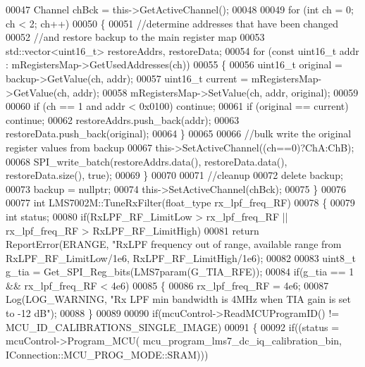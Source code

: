 \begin{DoxyCode}
00047     Channel chBck = this->GetActiveChannel();
00048 
00049     \textcolor{keywordflow}{for} (\textcolor{keywordtype}{int} ch = 0; ch < 2; ch++)
00050     \{
00051         \textcolor{comment}{//determine addresses that have been changed}
00052         \textcolor{comment}{//and restore backup to the main register map}
00053         std::vector<uint16\_t> restoreAddrs, restoreData;
00054         \textcolor{keywordflow}{for} (\textcolor{keyword}{const} uint16\_t addr : mRegistersMap->GetUsedAddresses(ch))
00055         \{
00056             uint16\_t original = backup->GetValue(ch, addr);
00057             uint16\_t current = mRegistersMap->GetValue(ch, addr);
00058             mRegistersMap->SetValue(ch, addr, original);
00059 
00060             \textcolor{keywordflow}{if} (ch == 1 and addr < 0x0100) \textcolor{keywordflow}{continue};
00061             \textcolor{keywordflow}{if} (original == current) \textcolor{keywordflow}{continue};
00062             restoreAddrs.push\_back(addr);
00063             restoreData.push\_back(original);
00064         \}
00065 
00066         \textcolor{comment}{//bulk write the original register values from backup}
00067         this->SetActiveChannel((ch==0)?ChA:ChB);
00068         SPI_write_batch(restoreAddrs.data(), restoreData.data(), restoreData.size(), \textcolor{keyword}{true});
00069     \}
00070 
00071     \textcolor{comment}{//cleanup}
00072     \textcolor{keyword}{delete} backup;
00073     backup = \textcolor{keyword}{nullptr};
00074     this->SetActiveChannel(chBck);
00075 \}
00076 
00077 \textcolor{keywordtype}{int} LMS7002M::TuneRxFilter(float_type rx\_lpf\_freq\_RF)
00078 \{
00079     \textcolor{keywordtype}{int} status;
00080     \textcolor{keywordflow}{if}(RxLPF_RF_LimitLow > rx\_lpf\_freq\_RF || rx\_lpf\_freq\_RF > RxLPF_RF_LimitHigh)
00081         \textcolor{keywordflow}{return} ReportError(ERANGE, \textcolor{stringliteral}{"RxLPF frequency out of range, available range from %
      RxLPF_RF_LimitLow/1e6, RxLPF_RF_LimitHigh/1e6);
00082 
00083     uint8\_t g\_tia = Get_SPI_Reg_bits(LMS7param(G_TIA_RFE));
00084     \textcolor{keywordflow}{if}(g\_tia == 1 && rx\_lpf\_freq\_RF < 4e6)
00085     \{
00086         rx\_lpf\_freq\_RF = 4e6;
00087         Log(LOG_WARNING, \textcolor{stringliteral}{"Rx LPF min bandwidth is 4MHz when TIA gain is set to -12 dB"});
00088     \}
00089 
00090     \textcolor{keywordflow}{if}(mcuControl->ReadMCUProgramID() != MCU_ID_CALIBRATIONS_SINGLE_IMAGE)
00091     \{
00092         \textcolor{keywordflow}{if}((status = mcuControl->Program_MCU(
      mcu_program_lms7_dc_iq_calibration_bin, IConnection::MCU\_PROG\_MODE::SRAM)))
}
\end{DoxyCode}
